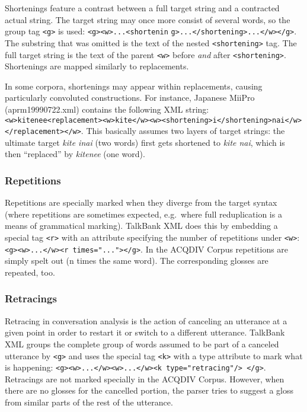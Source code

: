 \documentclass[a4paper, 11pt]{book}
\begin{document}
Shortenings feature a contrast between a full target string and a contracted actual string. The target string may once more consist of several words, so the group tag \texttt{<g>} is used: \texttt{<g><w>...<shortenin} \texttt{g>...</shortening>...</w></g>}. The substring that was omitted is the text of the nested \texttt{<shortening>} tag. The full target string is the text of the parent \texttt{<w>} before \emph{and} after \texttt{<shortening>}. Shortenings are mapped similarly to replacements.

In some corpora, shortenings may appear within replacements, causing particularly convoluted constructions. For instance, Japanese MiiPro (aprm19990722.xml) contains the following XML string: \texttt{<w>kitenee<replacement><w>kite</w><w><shortening>i</shortening>nai</w>\\</replacement></w>}. This basically assumes two layers of target strings: the ultimate target \emph{kite inai} (two words) first gets shortened to \emph{kite nai}, which is then “replaced” by \emph{kitenee} (one word).

\subsubsection*{Repetitions}

Repetitions are specially marked when they diverge from the target syntax (where repetitions are sometimes expected, e.g.\ where full reduplication is a means of grammatical marking). TalkBank XML does this by embedding a special tag \texttt{<r>} with an attribute specifying the number of repetitions under \texttt{<w>}: \texttt{<g><w>...</w><r times="..."></g>}. In the ACQDIV Corpus repetitions are simply spelt out (n times the same word). The corresponding glosses are repeated, too.

\subsubsection*{Retracings}

Retracing in conversation analysis is the action of canceling an utterance at a given point in order to restart it or switch to a different utterance. TalkBank XML groups the complete group of words assumed to be part of a canceled utterance by \texttt{<g>} and uses the special tag \texttt{<k>} with a type attribute to mark what is happening: \texttt{<g><w>...</w><w>...</w><k type="retracing"/> </g>}. Retracings are not marked specially in the ACQDIV Corpus. However, when there are no glosses for the cancelled portion, the parser tries to suggest a gloss from similar parts of the rest of the utterance.
\end{document}
